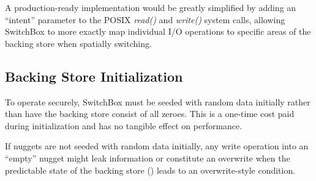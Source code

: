 A production-ready implementation would be greatly simplified by adding an
``intent'' parameter to the POSIX \textit{read()} and \textit{write()} system
calls, allowing SwitchBox to more exactly map individual I/O operations to
specific areas of the backing store when spatially switching. 

\subsection{Backing Store Initialization}

To operate securely, SwitchBox must be seeded with random data initially rather
than have the backing store consist of all zeroes. This is a one-time cost paid
during initialization and has no tangible effect on performance.

If nuggets are not seeded with random data initially, any write operation into
an ``empty'' nugget might leak information or constitute an overwrite when the
predictable state of the backing store () leads to
an overwrite-style condition.
